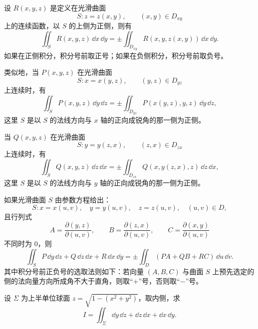 设 $R(x,y,z)$ 是定义在光滑曲面
\[
  S:z=z(x,y),\qquad (x,y)\in D_{xy}
\]
上的连续函数，以 $S$ 的上侧为正侧，则有
\[
  \iint_S R(x,y,z)\,\dd x\,\dd y
  =\pm\iint_{D_{xy}}R(x,y,z(x,y))\,\dd x\,\dd y.
\]
如果在正侧积分，积分号前取正号；如果在负侧积分，积分号前取负号。

类似地，当 $P(x,y,z)$ 在光滑曲面
\[
  S:x=x(y,z),\qquad (y,z)\in D_{yz}
\]
上连续时，有
\[
  \iint_S P(x,y,z)\,\dd y\,\dd z
  =\pm\iint_{D_{yz}}P(x(y,z),y,z)\,\dd y\,\dd z,
\]
这里 $S$ 是以 $S$ 的法线方向与 $x$ 轴的正向成锐角的那一侧为正侧。

当 $Q(x,y,z)$ 在光滑曲面
\[
  S:y=y(z,x),\qquad (z,x)\in D_{zx}
\]
上连续时，有
\[
  \iint_S Q(x,y,z)\,\dd z\,\dd x
  =\pm\iint_{D_{zx}}Q(x,y(z,x),z)\,\dd z\,\dd x,
\]
这里 $S$ 是以 $S$ 的法线方向与 $y$ 轴的正向成锐角的那一侧为正侧。

如果光滑曲面 $S$ 由参数方程给出：
\[
  S:x=x(u,v),\quad y=y(u,v),\quad z=z(u,v),\quad (u,v)\in D,
\]
且行列式
\[
  A=\frac{\partial(y,z)}{\partial(u,v)},\qquad
  B=\frac{\partial(z,x)}{\partial(u,v)},\qquad
  C=\frac{\partial(x,y)}{\partial(u,v)}
\]
不同时为 0，则
\begin{equation}
  \iint_S P\,\dd y\,\dd z+Q\,\dd z\,\dd x+R\,\dd x\,\dd y
  =\pm\iint_D(PA+QB+RC)\,\dd u\,\dd v.
  \tag{25.3}
\end{equation}
其中积分号前正负号的选取法则如下：若向量 $(A,B,C)$ 与曲面 $S$ 上预先选定的侧的法向量方向所成角不大于直角，则取“$+$”号，否则取“$-$”号。

\begin{xexample}[25.2.1]
设 $\Sigma$ 为上半单位球面 $z=\sqrt{1-(x^2+y^2)}$，取内侧，求
\[
  I=\iint_\Sigma \dd y\,\dd z+\dd z\,\dd x+\dd x\,\dd y.
\]
\end{xexample}

